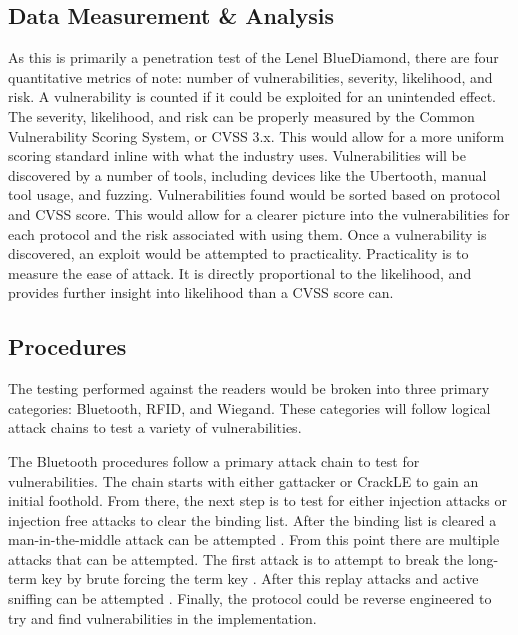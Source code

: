 \documentclass[10pt,twocolumn,letterpaper]{article}
\begin{document}
\subsection{Data Measurement \& Analysis}
As this is primarily a penetration test of the Lenel BlueDiamond, there are four quantitative metrics of note: number of vulnerabilities, severity, likelihood, and risk. A vulnerability is counted if it could be exploited for an unintended effect. The severity, likelihood, and risk can be properly measured by the Common Vulnerability Scoring System, or CVSS 3.x. This would allow for a more uniform scoring standard inline with what the industry uses. Vulnerabilities will be discovered by a number of tools, including devices like the Ubertooth, manual tool usage, and fuzzing. Vulnerabilities found would be sorted based on protocol and CVSS score. This would allow for a clearer picture into the vulnerabilities for each protocol and the risk associated with using them. Once a vulnerability is discovered, an exploit would be attempted to practicality. Practicality is to measure the ease of attack. It is directly proportional to the likelihood, and provides further insight into likelihood than a CVSS score can.

\subsection{Procedures}
The testing performed against the readers would be broken into three primary categories: Bluetooth, RFID, and Wiegand.  These categories will follow logical attack chains to test a variety of vulnerabilities.

The Bluetooth procedures follow a primary attack chain to test for vulnerabilities.  The chain starts with either gattacker \cite{GattackingJasek} \cite{BluetoothMITMTal} or CrackLE \cite{10.1145/3190645.3190693} to gain an initial foothold.  From there, the next step is to test for either injection attacks or injection free attacks \cite{jaihc19} to clear the binding list.  After the binding list is cleared a man-in-the-middle attack can be attempted \cite{lonzetta2018security} \cite{osullivan} \cite{BluetoothMITMTal}.  From this point there are multiple attacks that can be attempted.  The first attack is to attempt to break the long-term key by brute forcing the term key \cite{sevier2019securityofble} \cite{179196}.  After this replay attacks and active sniffing can be attempted \cite{filizzola2018security} \cite{osullivan}.  Finally, the protocol could be reverse engineered to try and find vulnerabilities in the implementation.
\end{document}
